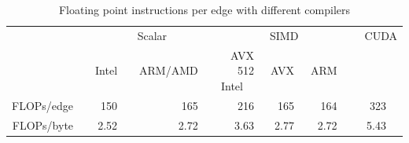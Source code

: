 \documentclass[runningheads]{llncs}
\begin{document}
\begin{table}[]\centering
\vspace{-15pt}\caption{Floating point instructions per edge with different 
compilers}
\renewcommand{\arraystretch}{1.2}
\label{tab:ops}
\begin{tabular}{@{}r|rr|rrr|r@{}}
\hline
&\multicolumn{2}{c|}{Scalar}  & \multicolumn{3}{c|}{SIMD}     &\ CUDA \\
&Intel\   &\ ARM/AMD\ \ &\ AVX 512 Intel\ \ &\ AVX  &\ ARM\ \ & \\\hline
FLOPs/edge\  \ & 150\   & 165\  \ & 216  & 165  & 164\ \  & 323\ \   \\\hline
FLOPs/byte\ \  & 2.52\  & 2.72\ \ & 3.63 & 2.77 & 2.72\ \ & 5.43\ \  \\\hline
\end{tabular}\vspace{-15pt}
\end{table}
\end{document}
